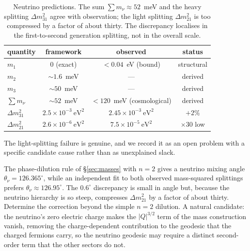 \begin{table}[h]
\centering
\begin{tabular}{lccc}
\hline
quantity & framework & observed & status \\
\hline
$m_1$            & $0$ (exact)                   & $< 0.04$~eV (bound)        & structural \\
$m_2$            & $\sim 1.6$~meV                & ---                        & derived \\
$m_3$            & $\sim 50$~meV                 & ---                        & derived \\
$\sum m_\nu$     & $\sim 52$~meV                 & $< 120$~meV (cosmological) & derived \\
$\Delta m^2_{31}$& $2.5\times10^{-3}\ \mathrm{eV}^2$ & $2.45\times10^{-3}\ \mathrm{eV}^2$ & $+2\%$ \\
$\Delta m^2_{21}$& $2.6\times10^{-6}\ \mathrm{eV}^2$ & $7.5\times10^{-5}\ \mathrm{eV}^2$  & $\times 30$ low \\
\hline
\end{tabular}
\caption{Neutrino predictions. The sum $\sum m_\nu \approx 52$~meV and the heavy splitting
$\Delta m^2_{31}$ agree with observation; the light splitting $\Delta m^2_{21}$ is too compressed by
a factor of about thirty. The discrepancy localises in the first-to-second generation splitting, not
in the overall scale.}
\label{tab:neutrino}
\end{table}

The light-splitting failure is genuine, and we record it as an open problem with a specific candidate
cause rather than as unexplained slack.

\begin{openproblem}\label{op:neutrino-splitting}
The phase-dilution rule of \S\ref{sec:masses} with $n = 2$ gives a neutrino mixing angle
$\theta_\nu = 126.365^\circ$, while an independent fit to both observed mass-squared splittings
prefers $\theta_\nu \approx 126.95^\circ$. The $0.6^\circ$ discrepancy is small in angle but, because
the neutrino hierarchy is so steep, compresses $\Delta m^2_{21}$ by a factor of about thirty.
Determine the correction beyond the simple $n = 2$ dilution. A natural candidate: the neutrino's zero
electric charge makes the $\lvert Q\rvert^{3/2}$ term of the mass construction vanish, removing the
charge-dependent contribution to the geodesic that the charged fermions carry, so the neutrino
geodesic may require a distinct second-order term that the other sectors do not.
\end{openproblem}

